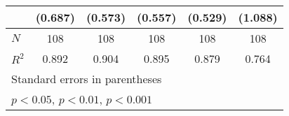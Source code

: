 {\begin{tabular}{l*{5}{c}}
            &     (0.687)         &     (0.573)         &     (0.557)         &     (0.529)         &     (1.088)         \\
\hline
\(N\)       &         108         &         108         &         108         &         108         &         108         \\
\(R^{2}\)   &       0.892         &       0.904         &       0.895         &       0.879         &       0.764         \\
\hline\hline
\multicolumn{6}{l}{\footnotesize Standard errors in parentheses}\\
\multicolumn{6}{l}{\footnotesize \sym{*} \(p<0.05\), \sym{**} \(p<0.01\), \sym{***} \(p<0.001\)}\\
\end{tabular}
}
